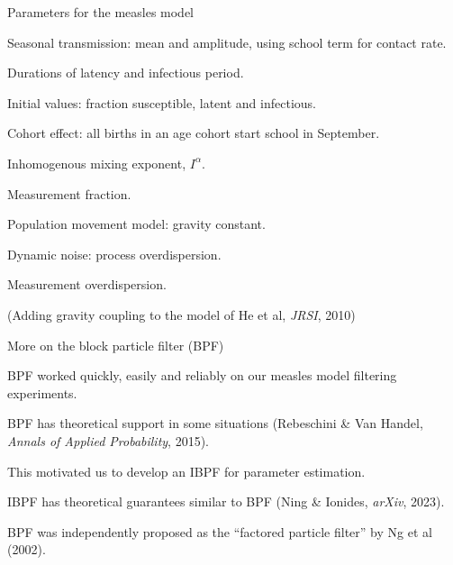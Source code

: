 \documentclass{beamer}
\begin{document}
\begin{frame}{Parameters for the measles model}
  \bi
\item Seasonal transmission: mean and amplitude, using school term for contact rate.
  \item Durations of latency and infectious period.
\item Initial values: fraction susceptible, latent and infectious.
\item Cohort effect: all births in an age cohort start school in September.
\item Inhomogenous mixing exponent, $I^{\alpha}$.
\item Measurement fraction.
\item Population movement model: gravity constant.
\item Dynamic noise: process overdispersion.
\item Measurement overdispersion.

\ei
\vspace{3mm}
(Adding gravity coupling to the model of He et al, {\it JRSI}, 2010)

  \end{frame}

\begin{frame}{More on the block particle filter (BPF)}

\bi
\item BPF worked quickly, easily and reliably on our measles model filtering experiments.

        \vspace{2mm}


\item BPF has theoretical support in some situations (Rebeschini \& Van Handel, {\it Annals of Applied Probability}, 2015).

        \vspace{2mm}

      \item This motivated us to develop an IBPF for parameter estimation.
        
        \vspace{2mm}

      \item IBPF has theoretical guarantees similar to BPF (Ning \& Ionides, {\it arXiv}, 2023).
        
        \vspace{2mm}

        
\item BPF was independently proposed as the ``factored particle filter'' by Ng et al (2002).

\ei

\end{frame}
\end{document}

